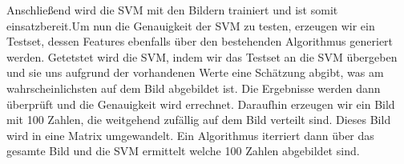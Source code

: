 Anschließend wird die SVM mit den Bildern trainiert und ist somit einsatzbereit.Um nun die Genauigkeit der SVM zu testen, erzeugen wir ein Testset, dessen Features ebenfalls über den bestehenden Algorithmus generiert werden. Getetstet wird die SVM, indem wir das Testset an die SVM übergeben und sie uns aufgrund der vorhandenen Werte eine Schätzung abgibt, was am wahrscheinlichsten auf dem Bild abgebildet ist. Die Ergebnisse werden dann überprüft und die Genauigkeit wird errechnet.
Daraufhin erzeugen wir ein Bild mit 100 Zahlen, die weitgehend zufällig auf dem Bild verteilt sind. Dieses Bild wird in eine Matrix umgewandelt. Ein Algorithmus iterriert dann über das gesamte Bild und die SVM ermittelt welche 100 Zahlen abgebildet sind.


